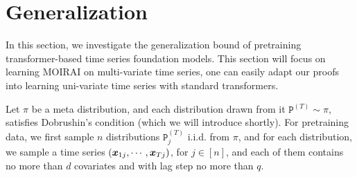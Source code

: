 \section{Generalization}
In this section, we investigate the generalization bound of pretraining transformer-based time series foundation models.
This section will focus on learning MOIRAI on multi-variate time series, one can easily adapt our proofs into learning uni-variate time series with standard transformers.

Let $\pi$ be a meta distribution, and each distribution drawn from it $ \mathtt{P}^{(T)} \sim \pi$, satisfies Dobrushin's condition \cite{Dobrushin1968TheDO} (which we will introduce shortly).
For pretraining data, we first sample $n$ distributions $\mathtt{P}_j^{(T)}$ i.i.d. from $\pi$, and for each distribution, we sample a time series $(\bm{x}_{1j}, \cdots, \bm{x}_{Tj})$, for $j \in[n]$, and each of them contains no more than $d$ covariates and with lag step no more than $q$.


